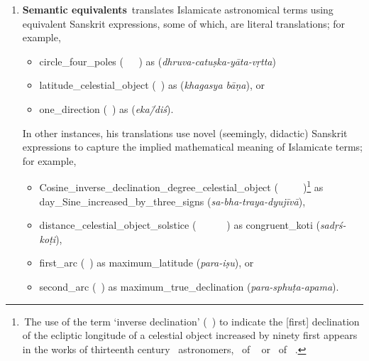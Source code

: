\begin{enumerate}[topsep=0pt]
    \item \textbf{Semantic equivalents}\quad \Nityananda\ translates Islamicate astronomical terms using equivalent Sanskrit expressions, some of which, are literal translations; for example,
    \begin{itemize}
    \item  \gls{circle_four_poles}  (\textit{\dayiri\idafavowel\ \marri\ \biaqtab\idafaconsonant\ \arbai}) as  (\textit{dhruva-catuṣka-yāta-vṛtta})
    \item \gls{latitude_celestial_object}  (\ard\idafaconsonant\ \kawkab) as  (\textit{khagasya bāṇa}), or
    \item \gls{one_direction}   (\yik\ \jahat) as   (\textit{eka\=/diś}).
    \end{itemize}
    In other instances, his translations use novel (seemingly, didactic) Sanskrit expressions to capture the implied mathematical meaning of Islamicate terms; for example,
    \begin{itemize}
        \item \gls{Cosine_inverse_declination_degree_celestial_object}\linebreak {}  (\jayb\idafaconsonant\ \tamam\idafaconsonant\ \mayl\idafaconsonant\ \mankus\idafaconsonant\ \daraji\idafavowel\ \kawkab)\footnote{\,The use of the term `inverse declination' (\almayl\ \almakus) to indicate the [first] declination of the ecliptic longitude of a celestial object increased by ninety first appears in the works of thirteenth century \Maragha\ astronomers, \eg \ZijIlkhani\ of \alTusi\ \parencite[188]{HamadanialTusi} or \Tajalazyaj\ of \alMaghribi\ \parencite[196]{Dorce}.} as \gls{day_Sine_increased_by_three_signs}  (\textit{sa-bha-traya-dyujīvā}),
        \item \gls{distance_celestial_object_solstice}  (\textit{\bud\idafaconsonant\ \kawkab\ \az\ \guillemotleft\dayiri\idafavowel\ \marri\ \biaqtab\idafaconsonant\ \arbai\guillemotright})  as \gls{congruent_koti}   (\textit{sadṛś-koṭi}),
        \item \gls{first_arc}  (\qaws\idafaconsonant\ \avval) as \gls{maximum_latitude}  (\textit{para-iṣu}), or
        \item \gls{second_arc}  (\qaws\idafaconsonant\ \duvum) as \gls{maximum_true_declination}  (\textit{para-sphuṭa-apama}).
    \end{itemize}
    

\end{enumerate}
